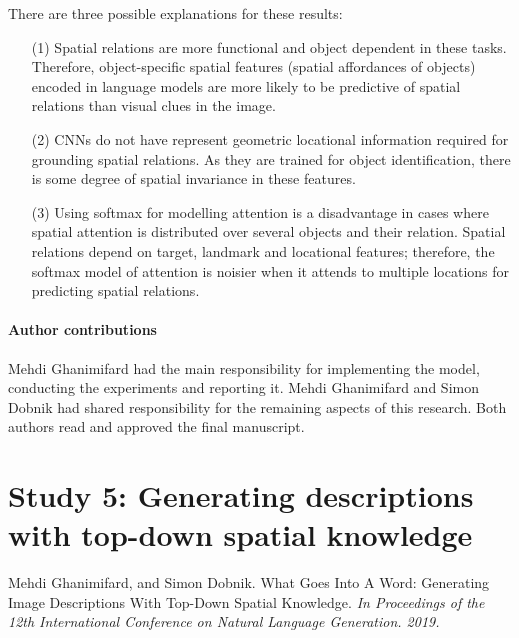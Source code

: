 There are three possible explanations for these results:%

\begin{itemize}
	\item[(1)] Spatial relations are more functional and object dependent in these tasks. Therefore, object-specific spatial features (spatial affordances of objects) encoded in language models are more likely to be predictive of spatial relations than visual clues in the image.
	\item[(2)] CNNs do not have 
	represent geometric
	locational information required for grounding spatial relations. As they are trained for object identification, there is some degree of spatial invariance in these features.
	\item[(3)] Using softmax for modelling attention is a 
	disadvantage 
	in cases where spatial attention is distributed over several objects and their relation.
	Spatial relations depend on target, landmark and locational features; therefore, the softmax model of attention is noisier when it attends to multiple locations for predicting spatial relations.
\end{itemize}


\paragraph{Author contributions}
Mehdi Ghanimifard had the main responsibility for implementing the model, conducting the experiments and reporting it. Mehdi Ghanimifard and Simon Dobnik had shared responsibility for the remaining aspects of this research. Both authors read and approved the final manuscript.

\section{Study 5: Generating descriptions with top-down spatial knowledge}
Mehdi Ghanimifard, and Simon Dobnik. 
What Goes Into A Word: Generating Image Descriptions With Top-Down Spatial Knowledge.
\textit{In Proceedings of the 12th International Conference on Natural Language Generation. 2019.}


